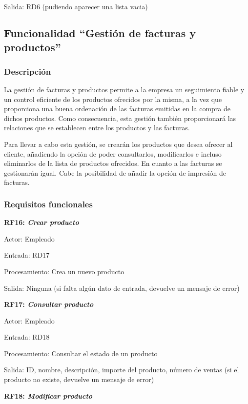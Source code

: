 \documentclass[paper=a4, fontsize=11pt, spanish]{scrartcl}
\begin{document}
Salida: RD6 (pudiendo aparecer una lista vacia)

\subsection{Funcionalidad “Gestión de facturas y productos”}

\subsubsection{Descripción}
\setlength{\parindent}{3em} La gestión de facturas y productos permite a la empresa un seguimiento fiable y un control eficiente de los productos ofrecidos por la misma, a la vez que proporciona una buena ordenación de las facturas emitidas en la compra de dichos productos. Como consecuencia, esta gestión también proporcionará las relaciones que se establecen entre los productos y las facturas.

	Para llevar a cabo esta gestión, se crearán los productos que desea ofrecer al cliente, añadiendo la opción de poder consultarlos, modificarlos e incluso eliminarlos de la lista de productos ofrecidos. En cuanto a las facturas se gestionarán igual. Cabe la posibilidad de añadir la opción de impresión de facturas.

\subsubsection{Requisitos funcionales}
\setlength{\parindent}{0em}
	\textbf{RF16: \textit{Crear producto}}
	\setlength{\parindent}{2em}

	Actor: Empleado

	Entrada: RD17

	Procesamiento: Crea un nuevo producto

	Salida: Ninguna (si falta algún dato de entrada, devuelve un mensaje de error)

	\setlength{\parindent}{0em}
	\textbf{RF17: \textit{Consultar producto}}
	\setlength{\parindent}{2em}

	Actor: Empleado

	Entrada: RD18

	Procesamiento: Consultar el estado de un producto

	Salida: ID, nombre, descripción, importe del producto, número de ventas (si el producto no existe, devuelve un mensaje de error)

	\setlength{\parindent}{0em}
	\textbf{RF18: \textit{Modificar producto}}
	\setlength{\parindent}{2em}
\end{document}
